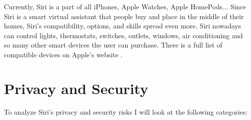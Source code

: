 \documentclass[
  digital, %
  oneside, %
  table,   %
  lof,     %
  lot,     %
]{fithesis3}
\begin{document}
Currently, Siri is a part of all iPhones, Apple Watches, Apple HomePods... Since Siri is a smart virtual assistant that people buy and place in the middle of their homes, Siri's compatibility, options, and skills spread even more. Siri nowadays can control lights, thermostats, switches, outlets, windows, air conditioning and so many other smart devices the user can purchase. There is a full list of compatible devices on Apple's website \parencite{siri_compatibility}. 

\section{Privacy and Security}

To analyze Siri's privacy and security risks I will look at the following categories:
\end{document}

